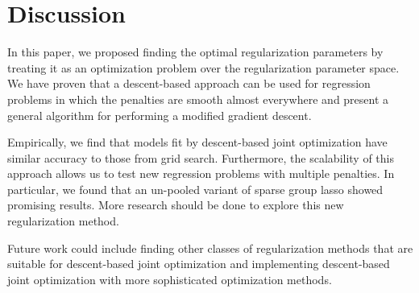 \documentclass{statsoc}
\begin{document}
\section{Discussion}
In this paper, we proposed finding the optimal regularization parameters by treating it as an optimization problem over the regularization parameter space. We have proven that a descent-based approach can be used for regression problems in which the penalties are smooth almost everywhere and present a general algorithm for performing a modified gradient descent.

Empirically, we find that models fit by descent-based joint optimization have similar accuracy to those from grid search. Furthermore, the scalability of this approach allows us to test new regression problems with multiple penalties. In particular, we found that an un-pooled variant of sparse group lasso showed promising results. More research should be done to explore this new regularization method.

Future work could include finding other classes of regularization methods that are suitable for descent-based joint optimization and implementing descent-based joint optimization with more sophisticated optimization methods.

\bigskip


\end{document}
